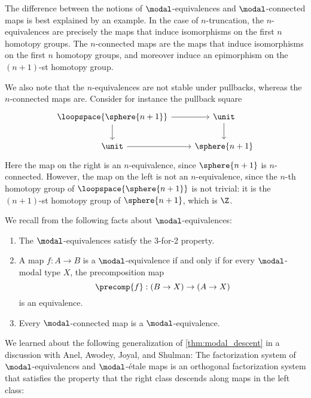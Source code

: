 \documentclass{msc}
\begin{document}
\begin{rmk}
The difference between the notions of $\modal$-equivalences and $\modal$-connected maps is best explained by an example. In the case of $n$-truncation, the $n$-equivalences are precisely the maps that induce isomorphisms on the first $n$ homotopy groups. The $n$-connected maps are the maps that induce isomorphisms on the first $n$ homotopy groups, and moreover induce an epimorphism on the $(n+1)$-st homotopy group. 

We also note that the $n$-equivalences are not stable under pullbacks, whereas the $n$-connected maps are. Consider for instance the pullback square
\begin{equation*}
\begin{tikzcd}
\loopspace {\sphere{n+1}} \arrow[r] \arrow[d] & \unit \arrow[d] \\
\unit\arrow[r] & \sphere{n+1}
\end{tikzcd}
\end{equation*}
Here the map on the right is an $n$-equivalence, since $\sphere{n+1}$ is $n$-connected. However, the map on the left is not an $n$-equivalence, since the $n$-th homotopy group of $\loopspace{\sphere{n+1}}$ is not trivial: it is the $(n+1)$-st homotopy group of $\sphere{n+1}$, which is $\Z$.
\end{rmk}
We recall from \cite{CORS} the following facts about $\modal$-equivalences:
\begin{prp}
  \label{lem:3for2_mequiv}\label{cor:mequiv_mconn}
  \begin{enumerate}
  \item The $\modal$-equivalences satisfy the 3-for-2 property.
  \item A map $f:A\to B$ is a $\modal$-equivalence if and only if for every $\modal$-modal type $X$, the precomposition map
    \begin{equation*}
      \precomp{f} : (B \to X) \to (A \to X)
    \end{equation*}
    is an equivalence.
  \item
    Every $\modal$-connected map is a $\modal$-equivalence.
  \end{enumerate}
\end{prp}

We learned about the following generalization of \cref{thm:modal_descent} in a discussion with Anel, Awodey, Joyal, and Shulman: The factorization system of $\modal$-equivalences and $\modal$-\'etale maps is an orthogonal factorization system that satisfies the property that the right class descends along maps in the left class:
\end{document}
